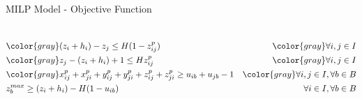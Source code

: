\documentclass{beamer}
\begin{document}
\begin{frame}{MILP Model - Objective Function}
\begin{columns}[onlytextwidth,T]
{\begin{minipage}{\linewidth}
\begin{align}
                                         & \color{gray} (z_i + h_i) - z_j\le H(1 - z^p_{ij})                                                     & \color{gray} \forall i,j \in I \notag \\
                                         & \color{gray} z_j - (z_i + h_i) + 1 \le H z^p_{ij}                                                     & \color{gray} \forall i,j \in I \notag \\
                                         & \color{gray} x^p_{ij} + x^p_{ji} + y^p_{ij} + y^p_{ji} + z^p_{ij} + z^p_{ji} \ge u_{ib} + u_{jb} - 1  & \color{gray} \forall i,j \in I, \forall b \in B \notag \\
                                         & z^{max}_b \ge (z_i + h_i) - H(1-u_{ib})                                                               & \forall i \in I, \forall b \in B \notag
                    \end{align}
                \end{minipage}
            }
            \end{columns}
    \end{frame}
\end{document}

